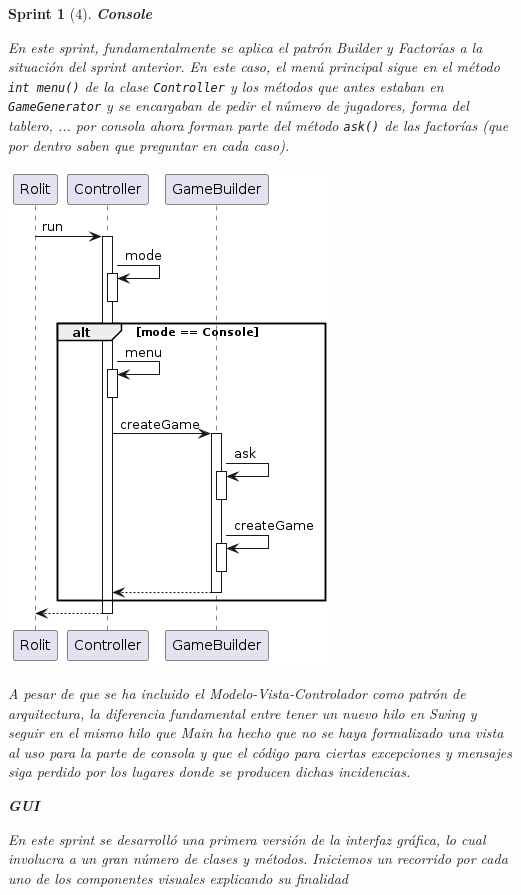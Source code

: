 \documentclass[12pt,a4paper,openright]{book}
\theoremstyle{break}
\newtheorem*{sprint}{Sprint}
\begin{document}
\begin{sprint}[4]
\textbf{Console}

En este sprint, fundamentalmente se aplica el patrón Builder y Factorías a la situación del sprint anterior. En este caso, el menú principal sigue en el método \texttt{int menu()} de la clase \texttt{Controller} y los métodos que antes estaban en \texttt{GameGenerator} y se encargaban de pedir el número de jugadores, forma del tablero, ... por consola ahora forman parte del método \texttt{ask()} de las factorías (que por dentro saben que preguntar en cada caso).
\begin{center}
\includegraphics[scale=0.55]{MenuPpal_sprint4_seq}
\end{center}
A pesar de que se ha incluido el \textit{Modelo-Vista-Controlador} como patrón de arquitectura, la diferencia fundamental entre tener un nuevo hilo en \textit{Swing} y seguir en el mismo hilo que \textit{Main} ha hecho que no se haya formalizado una vista al uso para la parte de consola y que el código para ciertas excepciones y mensajes siga perdido por los lugares donde se producen dichas incidencias.

\textbf{GUI}

En este sprint se desarrolló una primera versión de la interfaz gráfica, lo cual involucra a un gran número de clases y métodos. Iniciemos un recorrido por cada uno de los componentes visuales explicando su finalidad


\end{sprint}
\end{document}
